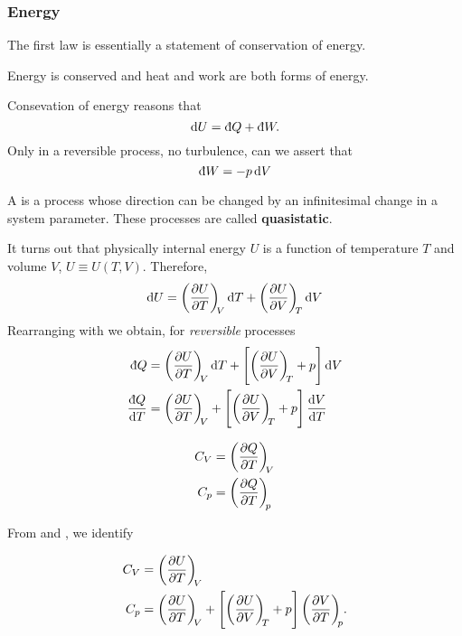 \subsubsection{Energy}
The first law is essentially a statement of conservation of energy.
\begin{defi}
Energy is conserved and heat and work are both forms of energy.
\end{defi}
Consevation of energy reasons that
\begin{equation}
\label{L1diff}
\dif U=\indiff Q+\indiff W.
\end{equation}
Only in a reversible process, \ie no turbulence, can we assert that
\begin{equation}
\label{workdiff}
\indiff W=-p\dif V
\end{equation}
\begin{defi}
	A  is a process whose direction can be changed by an infinitesimal change in a system parameter. 
	These processes are called \textbf{quasistatic}.
\end{defi}
It turns out that physically internal energy $U$ is a function of temperature $T$ and volume $V$, \ie $U\equiv U(T,V)$. 
Therefore, 
\begin{equation}
\dif U=\diffp UT[V] \dif T + \diffp UV[T]\dif V
\end{equation}
Rearranging  with  we obtain, for \textit{reversible} processes
\begin{equation}
\label{heatcap}
\begin{split}
\indiff Q&=\diffp UT[V]\dif T+\left[\diffp UV[T]+p\right] \dif V \\
\frac{\indiff Q}{\dif T}&=\diffp UT[V] +\left[\diffp UV[T]+p\right]\diff VT
\end{split}
\end{equation}
\begin{defi}
\label{def:heatcap}
\begin{subequations}
\begin{align}
C_V&=\diffp QT[V] \\
C_p&=\diffp QT[p]
\end{align}
\end{subequations}
\end{defi}

From  and , we identify
\begin{thrm}
\begin{subequations}
\begin{align}
C_V&=\diffp UT[V] \label{eq:cv}\\
C_p&=\diffp UT[V]+\left[\diffp UV[T]+p\right]\diffp VT[p]. \label{eq:cp}
\end{align}
\end{subequations}
\end{thrm}

